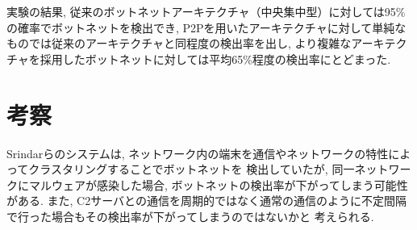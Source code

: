 \documentclass[twocolumn,9]{ltjsarticle}
\begin{document}
実験の結果, 従来のボットネットアーキテクチャ（中央集中型）に対しては95\%の確率でボットネットを検出でき, 
P2Pを用いたアーキテクチャに対して単純なものでは従来のアーキテクチャと同程度の検出率を出し, 
より複雑なアーキテクチャを採用したボットネットに対しては平均65\%程度の検出率にとどまった. 

\section{考察}
Srindarらのシステムは, ネットワーク内の端末を通信やネットワークの特性によってクラスタリングすることでボットネットを
検出していたが, 同一ネットワークにマルウェアが感染した場合, ボットネットの検出率が下がってしまう可能性がある. 
また, C2サーバとの通信を周期的ではなく通常の通信のように不定間隔で行った場合もその検出率が下がってしまうのではないかと
考えられる. 



\end{document}
